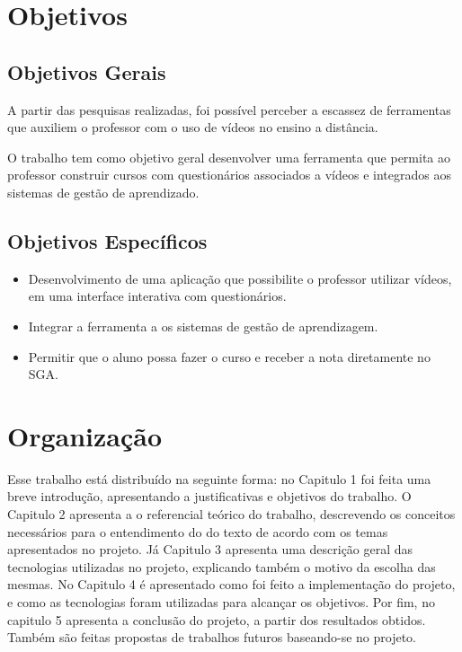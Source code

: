 \section{Objetivos}
\subsection{Objetivos Gerais}
A partir das pesquisas realizadas, foi possível perceber a escassez de ferramentas que auxiliem o professor com o uso de vídeos no ensino a distância.

O trabalho tem como objetivo geral desenvolver uma ferramenta que permita ao professor construir cursos com questionários associados a vídeos e integrados aos sistemas de gestão de aprendizado.
\subsection{Objetivos Específicos}
\begin{itemize}
  \item Desenvolvimento de uma aplicação que possibilite o professor utilizar vídeos, em uma interface interativa com questionários.
  \item Integrar a ferramenta a os sistemas de gestão de aprendizagem.
  \item Permitir que o aluno possa fazer o curso e receber a nota diretamente no \ac{SGA}.
\end{itemize}
\section{Organização}

Esse trabalho está distribuído na seguinte forma: no Capitulo 1 foi feita uma breve introdução, apresentando a justificativas e objetivos do trabalho. O Capitulo 2 apresenta a o referencial teórico do trabalho, descrevendo os conceitos necessários para o entendimento do do texto de acordo com os temas apresentados no projeto. Já Capitulo 3 apresenta uma descrição geral das tecnologias utilizadas no projeto, explicando também o motivo da escolha das mesmas. No Capitulo 4 é apresentado como foi feito a implementação do projeto, e como as tecnologias foram utilizadas para alcançar os objetivos. Por fim, no capitulo 5 apresenta a conclusão do projeto, a partir dos resultados obtidos. Também são feitas propostas de trabalhos futuros baseando-se no projeto.
